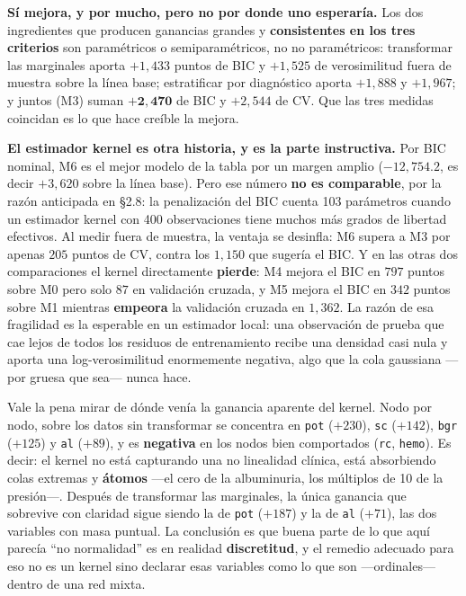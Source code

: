 \documentclass[11pt, a4paper]{article}
\begin{document}
\textbf{Sí mejora, y por mucho, pero no por donde uno esperaría.} Los dos ingredientes que
producen ganancias grandes y \textbf{consistentes en los tres criterios} son paramétricos o
semiparamétricos, no no paramétricos: transformar las marginales aporta $+1{,}433$ puntos de BIC y
$+1{,}525$ de verosimilitud fuera de muestra sobre la línea base; estratificar por diagnóstico
aporta $+1{,}888$ y $+1{,}967$; y juntos (M3) suman $\mathbf{+2{,}470}$ de BIC y $+2{,}544$ de
CV. Que las tres medidas coincidan es lo que hace creíble la mejora.

\textbf{El estimador kernel es otra historia, y es la parte instructiva.} Por BIC nominal, M6 es el
mejor modelo de la tabla por un margen amplio ($-12{,}754.2$, es decir $+3{,}620$ sobre la línea
base). Pero ese número \textbf{no es comparable}, por la razón anticipada en \S2.8: la penalización
del BIC cuenta 103 parámetros cuando un estimador kernel con 400 observaciones tiene muchos más
grados de libertad efectivos. Al medir fuera de muestra, la ventaja se desinfla: M6 supera a M3 por
apenas $205$ puntos de CV, contra los $1{,}150$ que sugería el BIC. Y en las otras dos
comparaciones el kernel directamente \textbf{pierde}: M4 mejora el BIC en $797$ puntos sobre M0
pero solo $87$ en validación cruzada, y M5 mejora el BIC en $342$ puntos sobre M1 mientras
\textbf{empeora} la validación cruzada en $1{,}362$. La razón de esa fragilidad es la esperable en
un estimador local: una observación de prueba que cae lejos de todos los residuos de entrenamiento
recibe una densidad casi nula y aporta una log-verosimilitud enormemente negativa, algo que la
cola gaussiana —por gruesa que sea— nunca hace.

Vale la pena mirar de dónde venía la ganancia aparente del kernel. Nodo por nodo, sobre los datos
sin transformar se concentra en \texttt{pot} ($+230$), \texttt{sc} ($+142$), \texttt{bgr} ($+125$)
y \texttt{al} ($+89$), y es \textbf{negativa} en los nodos bien comportados (\texttt{rc},
\texttt{hemo}). Es decir: el kernel no está capturando una no linealidad clínica, está
absorbiendo colas extremas y \textbf{átomos} —el cero de la albuminuria, los múltiplos de 10 de la
presión—. Después de transformar las marginales, la única ganancia que sobrevive con claridad
sigue siendo la de \texttt{pot} ($+187$) y la de \texttt{al} ($+71$), las dos variables con masa
puntual. La conclusión es que buena parte de lo que aquí parecía ``no normalidad'' es en realidad
\textbf{discretitud}, y el remedio adecuado para eso no es un kernel sino declarar esas variables
como lo que son —ordinales— dentro de una red mixta.
\end{document}
